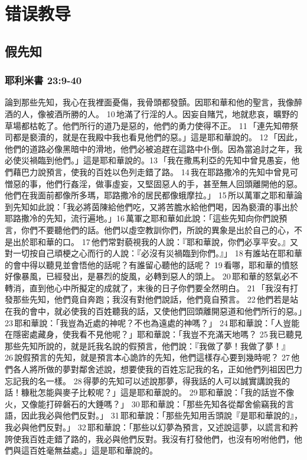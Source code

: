  \section{错误教导}
 
 \subsection{假先知}
 \subsubsection{耶利米書 23:9-40} 
論到那些先知，我心在我裡面憂傷，我骨頭都發顫。因耶和華和他的聖言，我像醉酒的人，像被酒所勝的人。 10 地滿了行淫的人。因妄自賭咒，地就悲哀，曠野的草場都枯乾了。他們所行的道乃是惡的，他們的勇力使得不正。 11 「連先知帶祭司都是褻瀆的，就是在我殿中我也看見他們的惡。」這是耶和華說的。 12 「因此，他們的道路必像黑暗中的滑地，他們必被追趕在這路中仆倒。因為當追討之年，我必使災禍臨到他們。」這是耶和華說的。13 「我在撒馬利亞的先知中曾見愚妄，他們藉巴力說預言，使我的百姓以色列走錯了路。 14 我在耶路撒冷的先知中曾見可憎惡的事，他們行姦淫，做事虛妄，又堅固惡人的手，甚至無人回頭離開他的惡。他們在我面前都像所多瑪，耶路撒冷的居民都像蛾摩拉。」 15 所以萬軍之耶和華論到先知如此說：「我必將茵陳給他們吃，又將苦膽水給他們喝，因為褻瀆的事出於耶路撒冷的先知，流行遍地。」16 萬軍之耶和華如此說：「這些先知向你們說預言，你們不要聽他們的話。他們以虛空教訓你們，所說的異象是出於自己的心，不是出於耶和華的口。 17 他們常對藐視我的人說：『耶和華說，你們必享平安。』又對一切按自己頑梗之心而行的人說：『必沒有災禍臨到你們。』」 18 有誰站在耶和華的會中得以聽見並會悟他的話呢？有誰留心聽他的話呢？ 19 看哪，耶和華的憤怒好像暴風，已經發出，是暴烈的旋風，必轉到惡人的頭上。 20 耶和華的怒氣必不轉消，直到他心中所擬定的成就了，末後的日子你們要全然明白。 21 「我沒有打發那些先知，他們竟自奔跑；我沒有對他們說話，他們竟自預言。 22 他們若是站在我的會中，就必使我的百姓聽我的話，又使他們回頭離開惡道和他們所行的惡。」23 耶和華說：「我豈為近處的神呢？不也為遠處的神嗎？」 24 耶和華說：「人豈能在隱密處藏身，使我看不見他呢？」耶和華說：「我豈不充滿天地嗎？ 25 我已聽見那些先知所說的，就是託我名說的假預言，他們說：『我做了夢！我做了夢！』 26 說假預言的先知，就是預言本心詭詐的先知，他們這樣存心要到幾時呢？ 27 他們各人將所做的夢對鄰舍述說，想要使我的百姓忘記我的名，正如他們列祖因巴力忘記我的名一樣。 28 得夢的先知可以述說那夢，得我話的人可以誠實講說我的話！糠秕怎能與麥子比較呢？」這是耶和華說的。 29 耶和華說：「我的話豈不像火，又像能打碎磐石的大錘嗎？」 30 耶和華說：「那些先知各從鄰舍偷竊我的言語，因此我必與他們反對。」 31 耶和華說：「那些先知用舌頭說『是耶和華說的』，我必與他們反對。」 32 耶和華說：「那些以幻夢為預言，又述說這夢，以謊言和矜誇使我百姓走錯了路的，我必與他們反對。我沒有打發他們，也沒有吩咐他們，他們與這百姓毫無益處。」這是耶和華說的。
